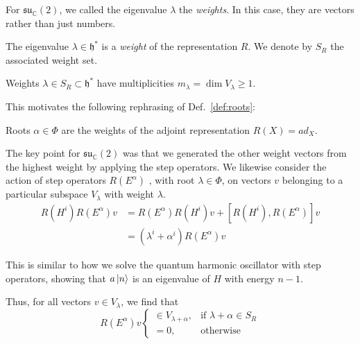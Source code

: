 For $\mathfrak{su}_{\mathbb{C}}(2)$, we called the eigenvalue $\lambda$ the  \emph{weights}. In this case, they are vectors rather than just numbers.

\begin{definition}[]
  The eigenvalue $\lambda \in \mathfrak{h}^*$ is a \emph{weight} of the representation $R$. We denote by $S_R$ the associated weight set.
\end{definition}

\begin{remark}
  Weights $\lambda \in S_R \subset \mathfrak{h}^*$ have multiplicities $m_{\lambda} = \dim V_{\lambda} \geq 1$.
\end{remark}

This motivates the following rephrasing of Def.~\ref{def:roots}:
\begin{definition}[]
  Roots $\alpha \in \Phi$ are the weights of the adjoint representation $R(X) = ad_X$.
\end{definition}

The key point for $\mathfrak{su}_{\mathbb{C}}(2)$ was that we generated the other weight vectors from the highest weight by applying the step operators.
We likewise consider the action of step operators $R(E^{\alpha})$ , with root $\lambda \in \Phi$, on vectors  $v$ belonging to a particular subspace  $V_\lambda$ with weight  $\lambda$.
 \begin{align}
  R(H^{i}) R(E^\alpha) v &=  R(E^\alpha) R(H^{i}) v + [R(H^{i}), R(E^{\alpha})] v \\
			 &= (\lambda^i+ \alpha^i) R(E^\alpha) v
\end{align}
\begin{leftbar}
  \begin{note}
    This is similar to how we solve the quantum harmonic oscillator with step operators, showing that $a \ket{n}$ is an eigenvalue of $H$ with energy $n - 1$.
  \end{note}
\end{leftbar}
Thus, for all vectors $v \in V_\lambda$, we find that
\begin{equation}
  R(E^\alpha) v 
  \begin{cases}
    \in V_{\lambda + \alpha}, & \text{if } \lambda + \alpha \in S_R \\
    = 0, & \text{otherwise}
  \end{cases}
\end{equation}

